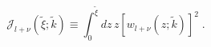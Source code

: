 \begin{equation}
{\mathcal J_{l+\nu}} ( \tilde{\xi};  \tilde{k}  )
  \equiv  
\int_{0}^{  \tilde{\xi}  } 
d z \, z
 \left[ 
w_{l+\nu}( z; \tilde{k})
\right]^{2} 
\;  .
\label{eq:mathcal_J_integral_def}
\end{equation}

